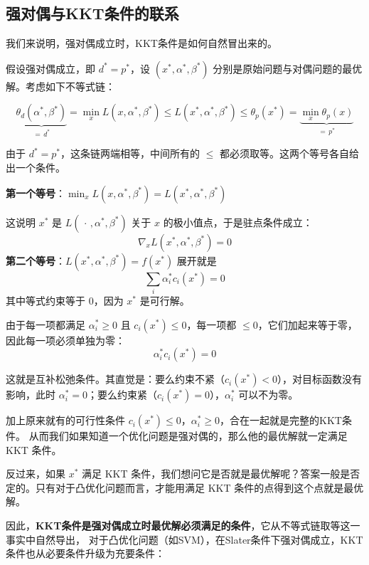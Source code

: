 \subsection{强对偶与KKT条件的联系}

我们来说明，强对偶成立时，KKT条件是如何自然冒出来的。
 
假设强对偶成立，即 $d^* = p^*$，设 $(x^*, \alpha^*,\beta^*)$ 分别是原始问题与对偶问题的最优解。考虑如下不等式链：
 
\begin{equation}
\underbrace{\theta_d(\alpha^*,\beta^*)}_{=\,d^*}
=
\min_x L(x,\alpha^*,\beta^*)
\leqslant
L(x^*,\alpha^*,\beta^*)
\leqslant
\theta_p(x^*)
=
\underbrace{\min_x\theta_p(x)}_{=\,p^*}
\end{equation}

由于 $d^* = p^*$，这条链两端相等，中间所有的 $\leqslant$ 都必须取等。这两个等号各自给出一个条件。
 
\textbf{第一个等号}：$\min_x L(x,\alpha^*,\beta^*) = L(x^*,\alpha^*,\beta^*)$

这说明 $x^*$ 是 $L(\,\cdot\,, \alpha^*,\beta^*)$ 关于 $x$ 的极小值点，于是驻点条件成立：
\begin{equation}
\nabla_x L(x^*,\alpha^*,\beta^*) = 0
\end{equation}
\textbf{第二个等号}：$L(x^*,\alpha^*,\beta^*) = f(x^*)$
展开就是
\begin{equation}
\sum_i \alpha_i^* c_i(x^*) = 0
\end{equation}
其中等式约束等于 $0$，因为 $x^*$ 是可行解。
 
由于每一项都满足 $\alpha_i^* \geqslant 0$ 且 $c_i(x^*) \leqslant 0$，每一项都 $\leqslant 0$，它们加起来等于零，因此每一项必须单独为零：
\begin{equation}
\alpha_i^* c_i(x^*) = 0
\end{equation}

这就是互补松弛条件。其直觉是：要么约束不紧（$c_i(x^*)<0$），对目标函数没有影响，此时 $\alpha_i^*=0$；要么约束紧（$c_i(x^*)=0$），$\alpha_i^*$ 可以不为零。

加上原来就有的可行性条件 $c_i(x^*)\leqslant 0$，$\alpha_i^*\geqslant 0$，合在一起就是完整的KKT条件。
从而我们如果知道一个优化问题是强对偶的，那么他的最优解就一定满足 KKT 条件。

反过来，如果 $x^*$ 满足 KKT 条件，我们想问它是否就是最优解呢？答案一般是否定的。只有对于凸优化问题而言，才能用满足 KKT 
条件的点得到这个点就是最优解。

因此，\textbf{KKT条件是强对偶成立时最优解必须满足的条件}，它从不等式链取等这一事实中自然导出，
对于凸优化问题（如SVM），在Slater条件下强对偶成立，KKT条件也从必要条件升级为充要条件：
 
